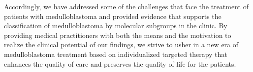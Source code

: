 Accordingly, we have addressed some of the challenges that face the treatment of patients with medulloblastoma and provided evidence that supports the classification of medulloblastoma by molecular subgroups in the clinic. By providing medical practitioners with both the means and the motivation to realize the clinical potential of our findings, we strive to usher in a new era of medulloblastoma treatment based on individualized targeted therapy that enhances the quality of care and preserves the quality of life for the patients.

